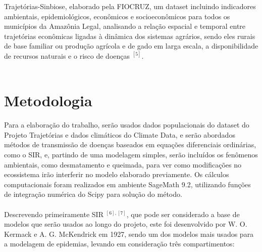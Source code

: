 \documentclass[12pt]{article}
\begin{document}
Trajetórias-Sinbiose, elaborado pela FIOCRUZ, um dataset incluindo 
indicadores ambientais, epidemiológicos, econômicos e socioeconômicos 
para todos os municípios da Amazônia Legal, analisando a relação espacial 
e temporal entre trajetórias econômicas ligadas à dinâmica dos sistemas 
agrários, sendo eles rurais de base familiar ou produção agrícola e de 
gado em larga escala, a disponibilidade de recursos naturais e o risco 
de doenças $^{[5]}$.
\\\\





\section{Metodologia}

Para a elaboração do trabalho, serão usados dados populacionais 
do dataset do Projeto Trajetórias e dados climáticos do Climate Data, 
e serão abordados métodos de transmissão de doenças baseados em equações 
diferenciais ordinárias, como o SIR, e, partindo de uma modelagem simples, 
serão incluídos os fenômenos ambientais, como desmatamento e queimada, para 
ver como modificações no ecossistema irão interferir no modelo elaborado 
previamente. Os cálculos computacionais foram realizados em ambiente SageMath 9.2, 
utilizando funções de integração numérica do Scipy para solução do método.
\\\\
Descrevendo primeiramente SIR $^{[6], [7]}$, que pode ser considerado a base de modelos que serão usados ao longo do projeto, este foi desenvolvido por W. O. Kermack e A. G. McKendrick em 1927, sendo um dos modelos mais usados para a modelagem de epidemias, levando em consideração três compartimentos:
\end{document}
